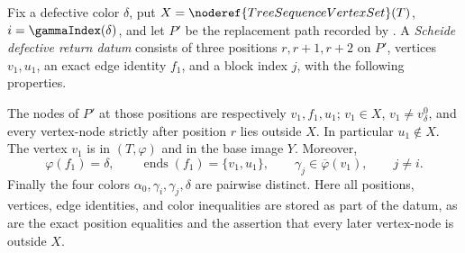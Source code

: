 \begin{definition}
Fix a defective color $\delta$, put
$X=\noderef{TreeSequenceVertexSet}(T)$,
$i=\gammaIndex(\delta)$, and let $P'$ be the replacement path recorded by
.  A
\emph{Scheide defective return datum} consists of three positions
$r,r+1,r+2$ on $P'$, vertices $v_1,u_1$, an exact edge identity $f_1$,
and a block index $j$, with the following properties.

The nodes of $P'$ at those positions are respectively
$v_1,f_1,u_1$; $v_1\in X$, $v_1\ne v^0_\delta$, and every vertex-node
strictly after position $r$ lies outside $X$.  In particular
$u_1\notin X$.  The vertex $v_1$ is in
$(T,\varphi)$ and in the base image $Y$.
Moreover,
\[
 \varphi(f_1)=\delta,\qquad
 \operatorname{ends}(f_1)=\{v_1,u_1\},\qquad
 \gamma_j\in\overline\varphi(v_1),\qquad j\ne i.
\]
Finally the four colors
$\alpha _0,\gamma_i,\gamma_j,\delta$ are pairwise distinct.  Here all
positions, vertices, edge identities, and color inequalities are stored as
part of the datum, as are the exact position equalities and the assertion
that every later vertex-node is outside $X$.
\end{definition}
